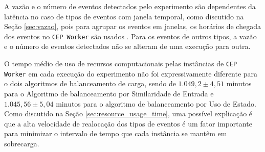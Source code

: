 

A vazão e o número de eventos detectados pelo experimento são dependentes da latência no caso de tipos de eventos com janela temporal, como discutido na Seção \ref{sec:vazao}, pois para agrupar os eventos em janelas, os horários de chegada dos eventos no \texttt{CEP Worker} são usados%
. Para os eventos de outros tipos, a vazão e o número de eventos detectados não se alteram de uma execução para outra.


O tempo médio de uso de recursos computacionais pelas instâncias de \texttt{CEP Worker} em cada execução do experimento não foi expressivamente diferente para o dois algoritmos de balanceamento de carga, sendo de  $1.049,2 \pm 4,51$ minutos para o Algoritmo de balanceamento por Similaridade de Entrada e $1.045,56 \pm 5,04$ minutos para o algoritmo de balanceamento por Uso de Estado. Como discutido na Seção \ref{sec:resource_usage_time}, uma possível explicação é que a alta velocidade de realocação dos tipos de eventos é um fator importante para minimizar o intervalo de tempo que cada instância se mantêm em sobrecarga. 


